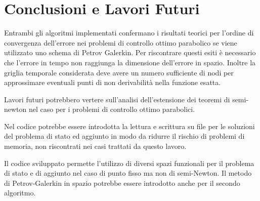 \section{Conclusioni e Lavori Futuri}
\label{chap:Conclusion}
Entrambi gli algoritmi implementati confermano i risultati teorici per l'ordine di convergenza dell'errore nei problemi di controllo ottimo parabolico se viene utilizzato uno schema di Petrov Galerkin. Per riscontrare questi esiti è necessario che l'errore in tempo non raggiunga la dimensione dell'errore in spazio. Inoltre la griglia temporale considerata deve avere un numero sufficiente di nodi per approssimare eventuali punti di non derivabilità nella funzione esatta.
\par
Lavori futuri potrebbero vertere sull'analisi dell'estensione dei teoremi di semi-newton nel caso per i problemi di controllo ottimo parabolici. 
\par
Nel codice potrebbe essere introdotta la lettura e scrittura su file per le soluzioni del problema di stato ed aggiunto in modo da ridurre il rischio di problemi di memoria, non riscontrati nei casi trattati da questo lavoro. 
\par
Il codice sviluppato permette l'utilizzo di diversi spazi funzionali per il problema di stato e di aggiunto nel caso di punto fisso ma non di semi-Newton. Il metodo di Petrov-Galerkin in spazio potrebbe essere introdotto anche per il secondo algoritmo.